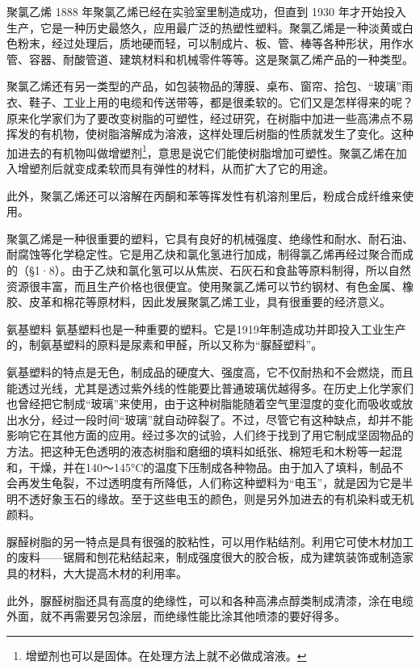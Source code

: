 聚氯乙烯 1888 年聚氯乙烯已经在实验室里制造成功，但直到 1930
年才开始投入生产，它是一种历史最悠久，应用最广泛的热塑性塑料。聚氯乙烯是一种淡黄或白色粉末，经过处理后，质地硬而轻，可以制成片、板、管、棒等各种形状，用作水管、容器、耐酸管道、建筑材料和机械零件等等。这是聚氯乙烯产品的一种类型。

聚氯乙烯还有另一类型的产品，如包装物品的薄膜、桌布、窗帘、拾包、``玻璃''雨衣、鞋子、工业上用的电缆和传送带等，都是很柔软的。它们又是怎样得来的呢？原来化学家们为了要改变树脂的可塑性，经过研究，在树脂中加进一些高沸点不易挥发的有机物，使树脂溶解成为溶液，这样处理后树脂的性质就发生了变化。这种加进去的有机物叫做增塑剂\footnote{增塑剂也可以是固体。在处理方法上就不必做成溶液。}，意思是说它们能使树脂增加可塑性。聚氯乙烯在加入增塑剂后就变成柔软而具有弹性的材料，从而扩大了它的用途。

此外，聚氯乙烯还可以溶解在丙酮和苯等挥发性有机溶剂里后，粉成合成纤维来使用。

聚氯乙烯是一种很重要的塑料，它具有良好的机械强度、绝缘性和耐水、耐石油、耐腐蚀等化学稳定性。它是用乙炔和氯化氢进行加成，制得氯乙烯再经过聚合而成的（§1·8）。由于乙炔和氯化氢可以从焦炭、石灰石和食盐等原料制得，所以自然资源很丰富，而且生产价格也很便宜。使用聚氯乙烯可以节约钢材、有色金属、橡胶、皮革和棉花等原材料，因此发展聚氯乙烯工业，具有很重要的经济意义。

氨基塑料
氨基塑料也是一种重要的塑料。它是1919年制造成功并即投入工业生产的，制氨基塑料的原料是尿素和甲醛，所以又称为``脲醛塑料''。

氨基塑料的特点是无色，制成品的硬度大、强度高，它不仅耐热和不会燃烧，而且能透过光线，尤其是透过紫外线的性能要比普通玻璃优越得多。在历史上化学家们也曾经把它制成``玻璃''来使用，由于这种树脂能随着空气里湿度的变化而吸收或放出水分，经过一段时间``玻璃''就自动碎裂了。不过，尽管它有这种缺点，却并不能影响它在其他方面的应用。经过多次的试验，人们终于找到了用它制成坚固物品的方法。把这种无色透明的液态树脂和磨细的填料如纸张、棉短毛和木粉等一起混和，干燥，并在140～145°C的温度下压制成各种物品。由于加入了填料，制品不会再发生龟裂，不过透明度有所降低，人们称这种塑料为``电玉''，就是因为它是半明不透好象玉石的缘故。至于这些电玉的颜色，则是另外加进去的有机染料或无机颜料。

脲醛树脂的另一特点是具有很强的胶粘性，可以用作粘结剂。利用它可使木材加工的废料------锯屑和刨花粘结起来，制成强度很大的胶合板，成为建筑装饰或制造家具的材料，大大提高木材的利用率。

此外，脲醛树脂还具有高度的绝缘性，可以和各种高沸点醇类制成清漆，涂在电缆外面，就不再需要另包涂层，而绝缘性能比涂其他喷漆的要好得多。


